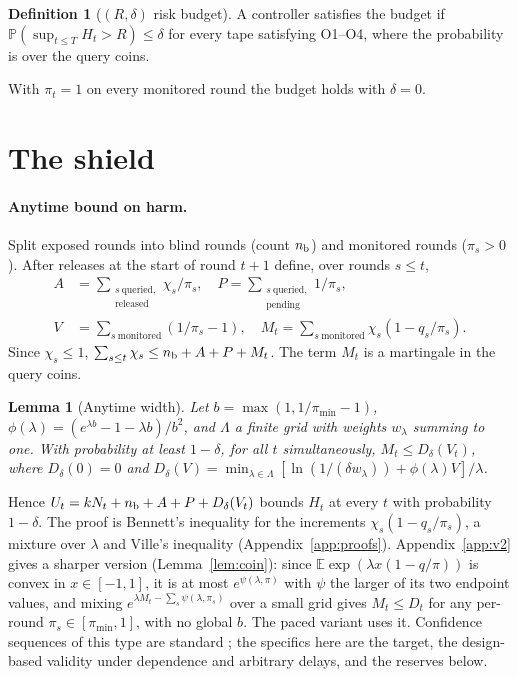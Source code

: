 \documentclass{article}
\theoremstyle{plain}
\newtheorem{lemma}{Lemma}
\theoremstyle{definition}
\newtheorem{definition}{Definition}
\newcommand{\PP}{\mathbb{P}}
\newcommand{\E}{\mathbb{E}}
\begin{document}
\begin{definition}[$(R,\delta)$ risk budget]
A controller satisfies the budget if $\PP(\sup_{t\le T}H_t>R)\le\delta$ for every tape satisfying O1--O4, where the probability is over the query coins.
\end{definition}
With $\pi_t=1$ on every monitored round the budget holds with $\delta=0$.

\section{The shield}\label{sec:method}
\paragraph{Anytime bound on harm.}
Split exposed rounds into blind rounds (count $n_{\rm b}$) and monitored rounds ($\pi_s>0$). After releases at the start of round $t+1$ define, over rounds $s\le t$,
{\small\begin{align*}
A&=\sum_{\substack{s\ \text{queried,}\\ \text{released}}}\!\chi_s/\pi_s,\quad
P=\sum_{\substack{s\ \text{queried,}\\ \text{pending}}}\!1/\pi_s,\\
V&=\sum_{s\ \text{monitored}}(1/\pi_s-1),\quad
M_t=\sum_{s\ \text{monitored}}\chi_s(1-q_s/\pi_s).
\end{align*}}
Since $\chi_s\le1$, $\sum_{s\le t}\chi_s\le n_{\rm b}+A+P+M_t$. The term $M_t$ is a martingale in the query coins.

\begin{lemma}[Anytime width]\label{lem:bennett}
Let $b=\max(1,1/\pi_{\min}-1)$, $\phi(\lambda)=(e^{\lambda b}-1-\lambda b)/b^2$, and $\Lambda$ a finite grid with weights $w_\lambda$ summing to one. With probability at least $1-\delta$, for all $t$ simultaneously, $M_t\le D_\delta(V_t)$, where $D_\delta(0)=0$ and $D_\delta(V)=\min_{\lambda\in\Lambda}[\ln(1/(\delta w_\lambda))+\phi(\lambda)V]/\lambda$.
\end{lemma}
Hence $U_t=kN_t+n_{\rm b}+A+P+D_\delta(V_t)$ bounds $H_t$ at every $t$ with probability $1-\delta$. The proof is Bennett's inequality for the increments $\chi_s(1-q_s/\pi_s)$, a mixture over $\lambda$ and Ville's inequality (Appendix~\ref{app:proofs}). Appendix~\ref{app:v2} gives a sharper version (Lemma~\ref{lem:coin}): since $\E\exp(\lambda x(1-q/\pi))$ is convex in $x\in[-1,1]$, it is at most $e^{\psi(\lambda,\pi)}$ with $\psi$ the larger of its two endpoint values, and mixing $e^{\lambda M_t-\sum_s\psi(\lambda,\pi_s)}$ over a small grid gives $M_t\le D_t$ for any per-round $\pi_s\in[\pi_{\min},1]$, with no global $b$. The paced variant uses it. Confidence sequences of this type are standard \cite{howard2021time,waudbysmith2024betting}; the specifics here are the target, the design-based validity under dependence and arbitrary delays, and the reserves below.
\end{document}
